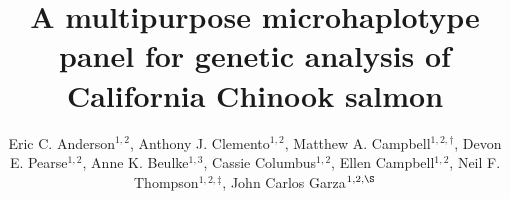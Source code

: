 

\newcommand{\myTitle}{A multipurpose microhaplotype panel for genetic analysis of California Chinook salmon}
\title{\myTitle}

\newcommand{\myAuthors}{Eric C. Anderson$^{1,\S}$, Anthony J. Clemento$^{1,2}$, Matthew A. Campbell$^{1,2\dagger}$, Devon E. Pearse$^{1,2}$, Anne K. Beulke$^{1,3}$, Cassie Columbus$^{1,2}$, Ellen Campbell$^{1,2}$, Neil F. Thompson$^{1,2\ddag}$, John Carlos Garza$^{1,2,\S}$}
\author{Eric C. Anderson$^{1,2}$, Anthony J. Clemento$^{1,2}$, Matthew A. Campbell$^{1,2,\dagger}$, Devon E. Pearse$^{1,2}$, Anne K. Beulke$^{1,3}$, Cassie Columbus$^{1,2}$, Ellen Campbell$^{1,2}$, Neil F. Thompson$^{1,2,\ddag}$, John Carlos Garza$^{1,2,\S}$}


\newcommand{\myAffiliations}{
$^1$Southwest Fisheries Science Center, National Marine Fisheries Service, NOAA, Santa Cruz, California, USA. $^2$Institute for Marine Sciences, University of California, Santa Cruz, USA. $^3$Department of Ocean Sciences, University of California, California, Santa Cruz, USA. $^\dagger$Current address: Centre for Carbon, Water and Food, The University of Sydney, 380 Werombi Road, NSW 2570, Australia. $^\ddag$Current address: Pacific Shellfish Research Unit, Agricultural Research Service, US Department of Agriculture, Newport, Oregon, USA.
}

\renewcommand{\AuthorAddresses}{\myAffiliations}

\renewcommand{\KeyWords}{Genetic stock identfication, population assignment, parentage based tagging, amplicon sequencing}

\renewcommand{\CorrespondingAuthor}{eric.anderson@noaa.gov,~carlos.garza@noaa.gov}


\newcommand{\myEmailAddress}{eric.anderson@noaa.gov,~carlos.garza@noaa.gov}
\newcommand{\myEmailFootnote}{$^\S$}

\newcommand{\myCopyright}{\copyright US Federal Government work in the public domain in the USA}

\newcommand{\myRunningTitle}{Microhaplotypes for California Chinook salmon}
\renewcommand{\RunningTitle}{\myRunningTitle}

\newcommand{\myRunningAuthor}{Anderson et al.}


